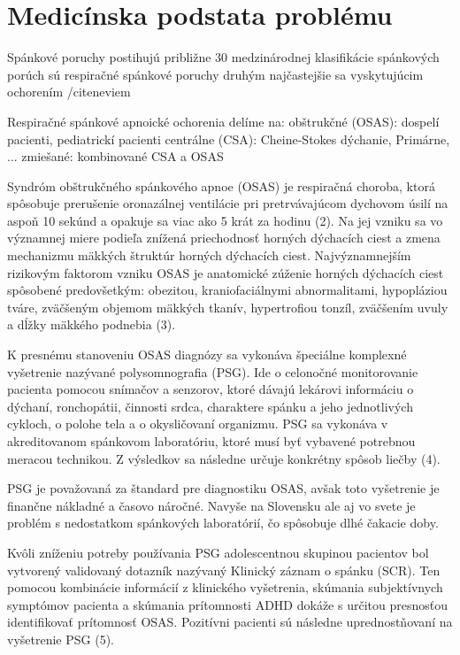 
\chapter{Medicínska podstata problému} \label{kap:Motivacia}

\pagestyle{fancy}
\fancyhf{}
\fancyfoot[CE,CO]{\thepage}

Spánkové poruchy postihujú približne 30%
medzinárodnej klasifikácie spánkových porúch sú respiračné spánkové poruchy druhým
najčastejšie sa vyskytujúcim ochorením /cite{neviem}

Respiračné spánkové apnoické ochorenia delíme na:
obštrukčné (OSAS): dospelí pacienti, pediatrickí pacienti
centrálne (CSA): Cheine-Stokes dýchanie, Primárne, ...
zmiešané: kombinované CSA a OSAS

Syndróm obštrukčného spánkového apnoe (OSAS) je respiračná choroba, ktorá spôsobuje
prerušenie oronazálnej ventilácie pri pretrvávajúcom dychovom úsilí na aspoň 10 sekúnd a
opakuje sa viac ako 5 krát za hodinu (2). Na jej vzniku sa vo významnej miere podieľa znížená
priechodnosť horných dýchacích ciest a zmena mechanizmu mäkkých štruktúr horných dýchacích
ciest. Najvýznamnejším rizikovým faktorom vzniku OSAS je anatomické zúženie horných
dýchacích ciest spôsobené predovšetkým: obezitou, kraniofaciálnymi abnormalitami, hypopláziou
tváre, zväčšeným objemom mäkkých tkanív, hypertrofiou tonzíl, zväčšením uvuly a dĺžky
mäkkého podnebia (3).

K presnému stanoveniu OSAS diagnózy sa vykonáva špeciálne komplexné vyšetrenie nazývané
polysomnografia (PSG). Ide o celonočné monitorovanie pacienta pomocou snímačov a senzorov,
ktoré dávajú lekárovi informáciu o dýchaní, ronchopátii, činnosti srdca, charaktere spánku a jeho
jednotlivých cykloch, o polohe tela a o okysličovaní organizmu. PSG sa vykonáva v
akreditovanom spánkovom laboratóriu, ktoré musí byť vybavené potrebnou meracou technikou. Z
výsledkov sa následne určuje konkrétny spôsob liečby (4).

PSG je považovaná za štandard pre diagnostiku OSAS, avšak toto vyšetrenie je finančne
nákladné a časovo náročné. Navyše na Slovensku ale aj vo svete je problém s nedostatkom
spánkových laboratórií, čo spôsobuje dlhé čakacie doby.

Kvôli zníženiu potreby používania PSG adolescentnou skupinou pacientov bol vytvorený
validovaný dotazník nazývaný Klinický záznam o spánku (SCR). Ten pomocou kombinácie
informácií z klinického vyšetrenia, skúmania subjektívnych symptómov pacienta a skúmania
prítomnosti ADHD dokáže s určitou presnosťou identifikovať prítomnosť OSAS. Pozitívni
pacienti sú následne uprednostňovaní na vyšetrenie PSG (5).

